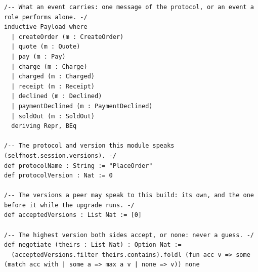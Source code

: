 \begin{lstlisting}[language={},basicstyle=\ttfamily\footnotesize,breaklines=true]
/-- What an event carries: one message of the protocol, or an event a role performs alone. -/
inductive Payload where
  | createOrder (m : CreateOrder)
  | quote (m : Quote)
  | pay (m : Pay)
  | charge (m : Charge)
  | charged (m : Charged)
  | receipt (m : Receipt)
  | declined (m : Declined)
  | paymentDeclined (m : PaymentDeclined)
  | soldOut (m : SoldOut)
  deriving Repr, BEq

/-- The protocol and version this module speaks (selfhost.session.versions). -/
def protocolName : String := "PlaceOrder"
def protocolVersion : Nat := 0

/-- The versions a peer may speak to this build: its own, and the one before it while the upgrade runs. -/
def acceptedVersions : List Nat := [0]

/-- The highest version both sides accept, or none: never a guess. -/
def negotiate (theirs : List Nat) : Option Nat :=
  (acceptedVersions.filter theirs.contains).foldl (fun acc v => some (match acc with | some a => max a v | none => v)) none
\end{lstlisting}
